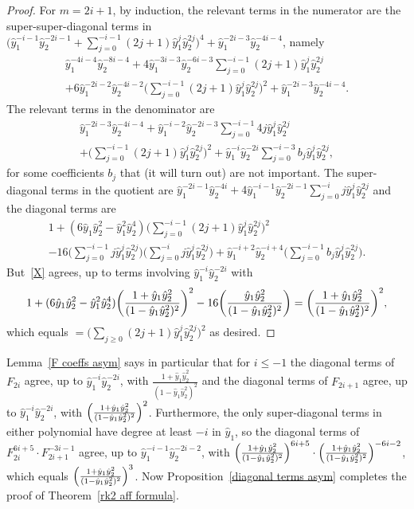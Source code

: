 \documentclass[ALCO,ThmDefs,Unicode,epreuves]{cedram}
\newcommand{\hy}{\hat{y}}
\begin{document}
\begin{proof}
For $m=2i+1$, by induction, the relevant terms in the numerator are the super-super-diagonal terms in $\bigl(\hy_1^{-i-1}\hy_2^{-2i-1}+\sum_{j=0}^{-i-1}(2j+1)\hy_1^j\hy_2^{2j}\bigr)^4+\hy_1^{-2i-3}\hy_2^{-4i-4}$, namely
\begin{multline}\label{odd numer}
\hy_1^{-4i-4}\hy_2^{-8i-4}+4\hy_1^{-3i-3}\hy_2^{-6i-3}\sum_{j=0}^{-i-1}(2j+1)\hy_1^j\hy_2^{2j}\\
+6\hy_1^{-2i-2}\hy_2^{-4i-2}\biggl(\sum_{j=0}^{-i-1}(2j+1)\hy_1^j\hy_2^{2j}\biggr)^2
+\hy_1^{-2i-3}\hy_2^{-4i-4}.
\end{multline}
The relevant terms in the denominator are
\begin{multline}\label{odd denom}
\hy_1^{-2i-3}\hy_2^{-4i-4}+\hy_1^{-i-2}\hy_2^{-2i-3}\sum_{j=0}^{-i-1}4j\hy_1^j\hy_2^{2j}\\
+\biggl(\sum_{j=0}^{-i-1}(2j+1)\hy_1^j\hy_2^{2j}\biggr)^2+\hy_1^{-i}\hy_2^{-2i}\sum_{j=0}^{-i-3}b_j\hy_1^j\hy_2^{2j},
\end{multline}
for some coefficients $b_j$ that (it will turn out) are not important.
The super-diagonal terms in the quotient are $\hy_1^{-2i-1}\hy_2^{-4i}+4\hy_1^{-i-1}\hy_2^{-2i-1}\sum_{j=0}^{-i}j\hy_1^j\hy_2^{2j}$ and the diagonal terms are
\begin{multline}\label{X}
1+(6\hy_1\hy_2^2-\hy_1^2\hy_2^4)\biggl(\sum_{j=0}^{-i-1}(2j+1)\hy_1^j\hy_2^{2j}\biggr)^2\\-16\biggl(\sum_{j=0}^{-i-1}j\hy_1^j\hy_2^{2j}\biggr)\biggl(\sum_{j=0}^{-i}j\hy_1^j\hy_2^{2j}\biggr)+\hy_1^{-i+2}\hy_2^{-i+4}\biggl(\sum_{j=0}^{-i-1}b_j\hy_1^j\hy_2^{2j}\biggr).
\end{multline}
But~\eqref{X} agrees, up to terms involving $\hy_1^{-i}\hy_2^{-2i}$ with 
\begin{equation}\label{X FPS}
1+(6\hy_1\hy_2^2-\hy_1^2\hy_2^4)\biggl(\frac{1+\hy_1\hy_2^2}{(1-\hy_1\hy_2^2)^2}\biggr)^2\\-16\biggl(\frac{\hy_1\hy_2^2}{(1-\hy_1\hy_2^2)^2}\biggr)=\biggl(\frac{1+\hy_1\hy_2^2}{(1-\hy_1\hy_2^2)^2}\biggr)^2,
\end{equation}
which equals $=\bigl(\sum_{j\ge0}(2j+1)\hy_1^j\hy_2^{2j}\bigr)^2$ as desired.
\end{proof}

Lemma~\ref{F coeffs asym} says in particular that for $i\le-1$ the diagonal terms of $F_{2i}$ agree, up to $\hy_1^{-i}\hy_2^{-2i}$, with $\frac{1+\hy_1\hy_2^2}{(1-\hy_1\hy_2^2)^2}$ and the diagonal terms of $F_{2i+1}$ agree, up to $\hy_1^{-i}\hy_2^{-2i}$, with $\Bigl(\frac{1+\hy_1\hy_2^2}{(1-\hy_1\hy_2^2)^2}\Bigr)^2$.
Furthermore, the only super-diagonal terms in either polynomial have degree at least $-i$ in $\hy_1$, so the diagonal terms of $F_{2i}^{6i+5}\cdot F_{2i+1}^{-3i-1}$ agree, up to $\hy_1^{-i-1}\hy_2^{-2i-2}$, with $\Bigl(\frac{1+\hy_1\hy_2^2}{(1-\hy_1\hy_2^2)^2}\Bigr)^{6i+5}\cdot\Bigl(\frac{1+\hy_1\hy_2^2}{(1-\hy_1\hy_2^2)^2}\Bigr)^{-6i-2}$, which equals $\Bigl(\frac{1+\hy_1\hy_2^2}{(1-\hy_1\hy_2^2)^2}\Bigr)^3$.
Now Proposition~\ref{diagonal terms asym} completes the proof of Theorem~\ref{rk2 aff formula}.
\end{document}

